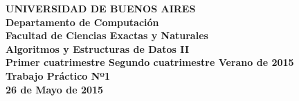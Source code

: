 
\def\Materia{Algoritmos y Estructuras de Datos II}
\def\cuatrimestre{1}
\def\elanio{2015}
\def\Titulo{\LARGE Trabajo Práctico Nº1}
\def\Fecha{26 de Mayo de 2015}

\newcommand{\cuatrimestreLindo}{
  \ifthenelse{\equal{\cuatrimestre}{1}}
  {Primer cuatrimestre}
  {\ifthenelse{\equal{\cuatrimestre}{2}}
  {Segundo cuatrimestre}
  {Verano}}
}


\thispagestyle{empty}


\vspace{5mm}

\begin{center}
  {\textbf{\large UNIVERSIDAD DE BUENOS AIRES}}\\[1.5em]
  {\textbf{\large Departamento de Computaci\'{o}n}}\\[1.5em]
    {\textbf{\large Facultad de Ciencias Exactas y Naturales}}\\
    \vspace{20mm}
    {\LARGE\textbf{\Materia}}\\[1em]    
    \vspace{5mm}
    {\LARGE\textbf{\cuatrimestreLindo de \elanio}}\\
    \vspace{15mm}
    {\Large \textbf{\Titulo}}\\[1em]
    \vspace{15mm}
    {\textbf{\Large \Fecha}}\\
    \vspace{15mm}
    \textbf{\tablaints}
\end{center}


